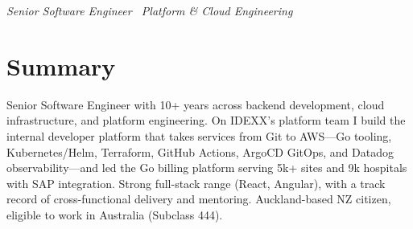 \documentclass{resume}
\begin{document}

\name{\textcolor{accent}{Jonathan Xu}}
\vspace{-0.3ex}
\centerline{\large\itshape\textcolor{accent}{Senior Software Engineer \textperiodcentered\ Platform \& Cloud Engineering}}
\vspace{0.9ex}

  \vspace{2em}

\section*{Summary}
Senior Software Engineer with 10+ years across backend development, cloud infrastructure, and platform engineering. On IDEXX's platform team I build the internal developer platform that takes services from Git to AWS—Go tooling, Kubernetes/Helm, Terraform, GitHub Actions, ArgoCD GitOps, and Datadog observability—and led the Go billing platform serving 5k+ sites and 9k hospitals with SAP integration. Strong full-stack range (React, Angular), with a track record of cross-functional delivery and mentoring. Auckland-based NZ citizen, eligible to work in Australia (Subclass 444).
\end{document}
